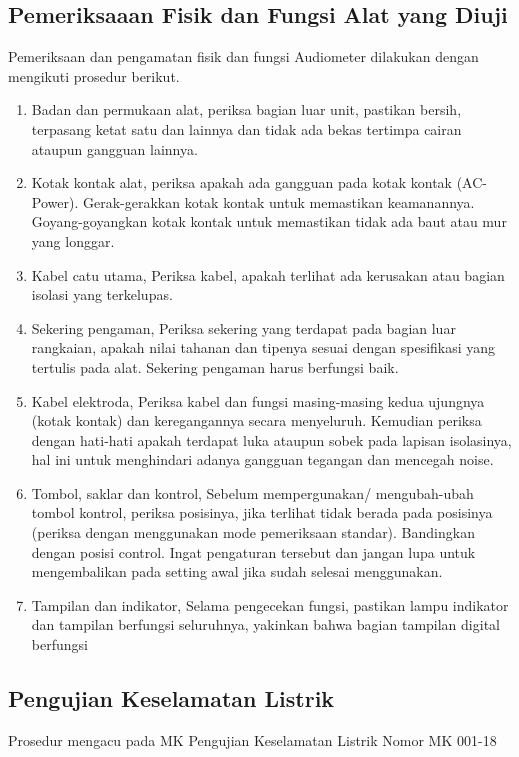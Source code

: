 \documentclass{article}
\begin{document}
	\subsection{Pemeriksaaan Fisik dan Fungsi Alat yang Diuji}
	Pemeriksaan dan pengamatan fisik dan fungsi Audiometer dilakukan dengan mengikuti prosedur berikut.
	\begin{enumerate}
		\item Badan dan permukaan alat, periksa bagian luar unit, pastikan bersih, terpasang ketat satu dan lainnya dan tidak ada bekas tertimpa cairan ataupun gangguan lainnya.
		\item Kotak kontak alat, periksa apakah ada gangguan pada kotak kontak (AC-Power). Gerak-gerakkan kotak kontak untuk memastikan keamanannya. Goyang-goyangkan kotak kontak untuk memastikan tidak ada baut atau mur yang longgar.
		\item Kabel catu utama, Periksa kabel, apakah terlihat ada kerusakan atau bagian isolasi yang terkelupas.
		\item Sekering pengaman, Periksa sekering yang terdapat pada bagian luar rangkaian, apakah nilai tahanan dan tipenya sesuai dengan spesifikasi yang tertulis pada alat. Sekering pengaman harus berfungsi baik.
		\item Kabel elektroda, Periksa kabel dan fungsi masing-masing kedua ujungnya (kotak kontak) dan keregangannya secara menyeluruh. Kemudian periksa dengan hati-hati apakah terdapat luka ataupun sobek pada lapisan isolasinya, hal ini untuk menghindari adanya gangguan tegangan dan mencegah noise.
		\item Tombol, saklar dan kontrol, Sebelum mempergunakan/ mengubah-ubah tombol kontrol, periksa posisinya, jika terlihat tidak berada pada posisinya (periksa dengan menggunakan mode pemeriksaan standar). Bandingkan dengan posisi control. Ingat pengaturan tersebut dan jangan lupa untuk mengembalikan pada setting awal jika sudah selesai menggunakan.
		\item Tampilan dan indikator, Selama pengecekan fungsi, pastikan lampu indikator dan tampilan berfungsi seluruhnya, yakinkan bahwa bagian tampilan digital berfungsi
	\end{enumerate}
	
	\subsection{Pengujian Keselamatan Listrik}
	Prosedur mengacu pada MK Pengujian Keselamatan Listrik Nomor MK 001-18
	
\end{document}
